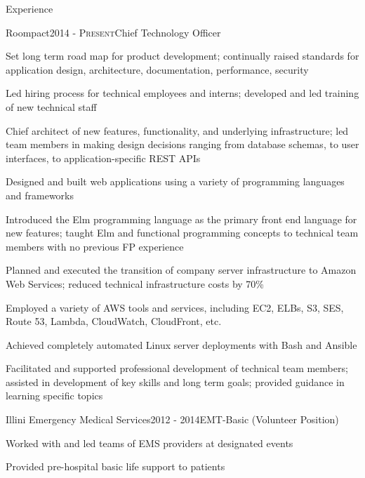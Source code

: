 \documentclass{resume} %
\begin{document}

\begin{rSection}{Experience}
\begin{rSubsection}{Roompact}{\textsc{2014 - Present}}{Chief Technology Officer}{}
\item Set long term road map for product development; continually raised standards for application design, architecture, documentation, performance, security
\item Led hiring process for technical employees and interns; developed and led training of new technical staff
\item Chief architect of new features, functionality, and underlying infrastructure; led team members in making design decisions ranging from database schemas,  to user interfaces, to application-specific REST APIs
\item Designed and built web applications using a variety of programming languages and frameworks
\item Introduced the Elm programming language as the primary front end language for new features; taught Elm and functional programming concepts to technical team members with no previous FP experience
\item Planned and executed the transition of company server infrastructure to Amazon Web Services; reduced technical infrastructure costs by 70\%
\item Employed a variety of AWS tools and services, including EC2, ELBs, S3, SES, Route 53, Lambda, CloudWatch, CloudFront, etc.
\item Achieved completely automated Linux server deployments with Bash and Ansible
\item Facilitated and supported professional development of technical team members; assisted in development of key skills and long term goals; provided guidance in learning specific topics
\end{rSubsection}


\begin{rSubsection}{Illini Emergency Medical Services}{\textsc{2012 - 2014}}{EMT-Basic (Volunteer Position)}{}
\item Worked with and led teams of EMS providers at designated events
\item Provided pre-hospital basic life support to patients
\end{rSubsection}


\end{rSection}
\end{document}
